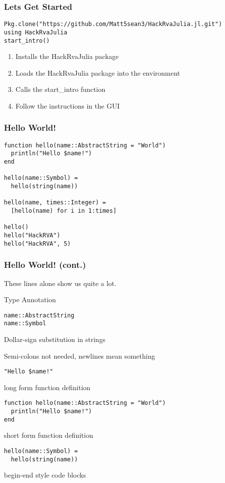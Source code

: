 \documentclass{beamer}
\begin{document}
\begin{frame}[fragile]
\frametitle{Lets Get Started}
\begin{verbatim}
Pkg.clone("https://github.com/Matt5sean3/HackRvaJulia.jl.git")
using HackRvaJulia
start_intro()
\end{verbatim}
\begin{enumerate}
  \item Installs the HackRvaJulia package
  \item Loads the HackRvaJulia package into the environment
  \item Calls the start\_intro function
  \item Follow the instructions in the GUI
\end{enumerate}
\end{frame}

\begin{frame}[fragile]
\frametitle{Hello World!}
\begin{verbatim}
function hello(name::AbstractString = "World")
  println("Hello $name!")
end

hello(name::Symbol) =
  hello(string(name))

hello(name, times::Integer) =
  [hello(name) for i in 1:times]

hello()
hello("HackRVA")
hello("HackRVA", 5)
\end{verbatim}
\end{frame}

\begin{frame}[fragile]
\frametitle{Hello World! (cont.)}
These lines alone show us quite a lot.

Type Annotation
\begin{verbatim}
name::AbstractString
name::Symbol
\end{verbatim}

Dollar-sign substitution in strings

Semi-colons not needed, newlines mean something
\begin{verbatim}
"Hello $name!"
\end{verbatim}

long form function definition
\begin{verbatim}
function hello(name::AbstractString = "World")
  println("Hello $name!")
end
\end{verbatim}

short form function definition
\begin{verbatim}
hello(name::Symbol) =
  hello(string(name))
\end{verbatim}

begin-end style code blocks
\end{frame}
\end{document}
